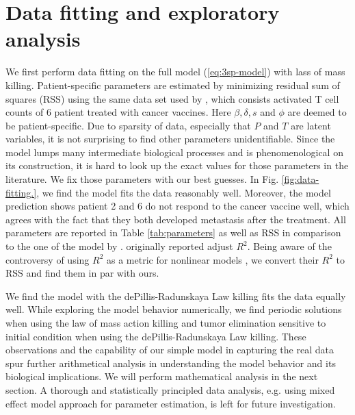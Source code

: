 \documentclass[review,authoryear]{elsarticle}
\begin{document}
\section{Data fitting and exploratory analysis} \label{sec:data}
We first perform data fitting on the full model (\ref{eq:3sp-model}) with lass of mass killing. Patient-specific parameters are estimated by minimizing residual sum of squares (RSS) using the same data set used by \cite{Messan2021}, which consists activated T cell counts of 6 patient treated with cancer vaccines. Here $\beta, \delta, s$ and $\phi$ are deemed to be patient-specific. Due to sparsity of data, especially that $P$ and $T$ are latent variables, it is not surprising to find other parameters unidentifiable.  Since the model lumps many intermediate biological processes and is phenomenological on its construction, it is hard to look up the exact values for those parameters in the literature. We fix those parameters with our best guesses. In Fig. \ref{fig:data-fitting.}, we find the model fits the data reasonably well. Moreover, the model prediction shows patient 2 and 6 do not respond to the cancer vaccine well, which agrees with the fact that they both developed metastasis after the treatment. All parameters are reported in Table \ref{tab:parameters} as well as RSS in comparison to the one of the model by \cite{Messan2021}. \cite{Messan2021} originally reported adjust $R^2$. Being aware of the controversy of using $R^2$ as a metric for nonlinear models \citep{Spiess2010}, we convert their $R^2$ to RSS and find them  in par with ours. 

We find the model with the dePillis-Radunskaya Law killing fits the data equally well. While exploring the model behavior numerically, we find periodic solutions when using the law of mass action killing and tumor elimination sensitive to initial condition when using the dePillis-Radunskaya Law killing. These observations and the capability of our simple model in capturing the real data spur further arithmetical analysis in understanding the model behavior and its biological implications. We will perform mathematical analysis in the next section. A thorough and statistically principled data analysis, e.g. using mixed effect model approach for parameter estimation, is left for future investigation. 


     
\end{document}
